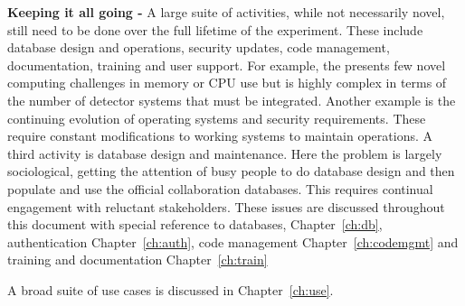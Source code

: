 \documentclass[../main-v1.tex]{subfiles}
\begin{document}
\begin{description}
\item{\bf Keeping it all going -}  %
A large suite of activities, %
while not necessarily novel, %
still need to be done over the full lifetime of the experiment.  These include database design and operations, security updates, code management, documentation, training and user support.   For example, the  presents few novel computing challenges in memory or CPU use but is highly complex in terms of the number of detector systems that must be integrated. Another example is the continuing evolution of operating systems and security requirements.  These require constant modifications to working systems to maintain operations.  A third activity is database design and maintenance. Here the problem is largely sociological, getting the attention of busy people to do database design and then %
populate and use the official collaboration databases. This requires continual engagement with reluctant stakeholders. These issues are discussed throughout this document with special reference to databases, Chapter~\ref{ch:db}, authentication Chapter~\ref{ch:auth}, code management Chapter~\ref{ch:codemgmt} and training and documentation Chapter~\ref{ch:train}
\end{description}
A broad suite of use cases is discussed in Chapter~\ref{ch:use}.


\end{document}
